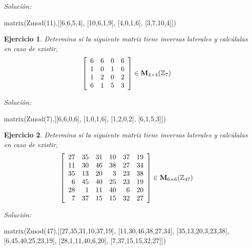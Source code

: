 \documentclass{amsart}
\newtheorem{ejer}{Ejercicio}
\begin{document}
{\it Soluci\'on:}

\begin{sageblock}
matrix(Zmod(11),[[6,6,5,4],
[10,6,1,9],
[4,0,1,6],
[3,7,10,4]])
\end{sageblock}



\begin{ejer} Determina si la siguiente matriz tiene inversas laterales y calc\'ulalas en caso de existir,
\[ \left[\begin{array}{rrrr}
6 & 6 & 0 & 6 \\
1 & 0 & 1 & 6 \\
1 & 2 & 0 & 2 \\
6 & 1 & 5 & 3
\end{array}\right] \in {\bf M}_{4\times 4}({\mathbb Z}_{7})\]
\end{ejer}

{\it Soluci\'on:}

\begin{sageblock}
matrix(Zmod(7),[[6,6,0,6],
[1,0,1,6],
[1,2,0,2],
[6,1,5,3]])
\end{sageblock}



\begin{ejer} Determina si la siguiente matriz tiene inversas laterales y calc\'ulalas en caso de existir,
\[ \left[\begin{array}{rrrrrr}
27 & 35 & 31 & 10 & 37 & 19 \\
11 & 30 & 46 & 38 & 27 & 34 \\
35 & 13 & 20 & 3 & 23 & 38 \\
6 & 45 & 40 & 25 & 23 & 19 \\
28 & 1 & 11 & 40 & 6 & 20 \\
7 & 37 & 15 & 15 & 32 & 27
\end{array}\right] \in {\bf M}_{6\times 6}({\mathbb Z}_{47})\]
\end{ejer}

{\it Soluci\'on:}

\begin{sageblock}
matrix(Zmod(47),[[27,35,31,10,37,19],
[11,30,46,38,27,34],
[35,13,20,3,23,38],
[6,45,40,25,23,19],
[28,1,11,40,6,20],
[7,37,15,15,32,27]])
\end{sageblock}

\end{document}
